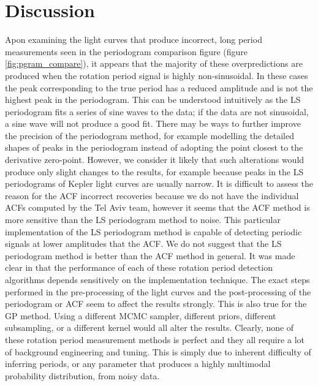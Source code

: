 \documentclass[a4paper,fleqn,usenatbib,useAMS]{mnras}
\newcommand{\response}[1]{{#1}}
\begin{document}
\section{Discussion}
\label{sec:discussion}

\response{Apon examining the light curves that produce incorrect, long period
measurements seen in the periodogram comparison figure (figure
\ref{fig:pgram_compare}), it appears that the majority of these
overpredictions are produced when the rotation period signal is highly
non-sinusoidal.
In these cases the peak corresponding to the true period has a reduced
amplitude and is not the highest peak in the periodogram.
This can be understood intuitively as the LS periodogram fits a series of sine
waves to the data; if the data are not sinusoidal, a sine wave will not
produce a good fit.
There may be ways to further improve the precision of the periodogram method,
for example modelling the detailed shapes of peaks in the periodogram instead
of adopting the point closest to the derivative zero-point.
However, we consider it likely that such alterations would produce only slight
changes to the results, for example because peaks in the LS periodograms of
Kepler light curves are usually narrow.
It is difficult to assess the reason for the ACF incorrect recoveries because
we do not have the individual ACFs computed by the \citet{Aigrain2015} Tel
Aviv team, however it seems that the ACF method is more sensitive than the LS
periodogram method to noise.
This particular implementation of the LS periodogram method is capable of
detecting periodic signals at lower amplitudes that the ACF.
We do not suggest that the LS periodogram method is better than the ACF method
in general.
It was made clear in \citet{Aigrain2015} that the performance of each of these
rotation period detection algorithms depends sensitively on the
implementation technique.
The exact steps performed in the pre-processing of the light curves and the
post-processing of the periodogram or ACF seem to affect the results strongly.
This is also true for the GP method.
Using a different MCMC sampler, different priors, different subsampling, or a
different kernel would all alter the results.
Clearly, none of these rotation period measurement methods is perfect and they
all require a lot of background engineering and tuning.
This is simply due to inherent difficulty of inferring periods, or any
parameter that produces a highly multimodal probability distribution, from
noisy data.}
\end{document}
